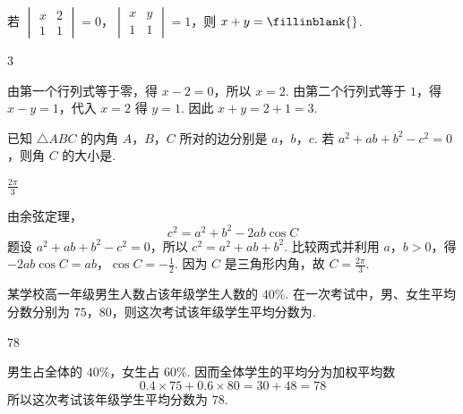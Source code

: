 \begin{problem}
若 \(\begin{vmatrix} x & 2 \\ 1 & 1 \end{vmatrix} = 0\)，\(\begin{vmatrix} x & y \\ 1 & 1 \end{vmatrix} = 1\)，则 \(x + y =\fillinblank{}\).

\begin{answer}
\(3\)
\end{answer}

\begin{solution}
由第一个行列式等于零，得 \(x-2=0\)，所以 \(x=2\). 由第二个行列式等于 \(1\)，得 \(x-y=1\)，代入 \(x=2\) 得 \(y=1\). 因此 \(x+y=2+1=3\).
\end{solution}
\end{problem}

\begin{problem}
已知 \(\triangle ABC\) 的内角 \(A\)，\(B\)，\(C\) 所对的边分别是 \(a\)，\(b\)，\(c\). 若 \(a^2 + ab + b^2 - c^2 = 0\)，则角 \(C\) 的大小是\fillinblank{}.

\begin{answer}
\(\frac{2\pi}{3}\)
\end{answer}

\begin{solution}
由余弦定理，
\[
c^2=a^2+b^2-2ab\cos C
\]
题设 \(a^2+ab+b^2-c^2=0\)，所以 \(c^2=a^2+ab+b^2\). 比较两式并利用 \(a\)，\(b>0\)，得
\(-2ab\cos C=ab\)，\(\cos C=-\frac{1}{2}\).
因为 \(C\) 是三角形内角，故 \(C=\frac{2\pi}{3}\).
\end{solution}
\end{problem}

\begin{problem}
某学校高一年级男生人数占该年级学生人数的 \(40\%\). 在一次考试中，男、女生平均分数分别为 \(75\)，\(80\)，则这次考试该年级学生平均分数为\fillinblank{}.

\begin{answer}
\(78\)
\end{answer}

\begin{solution}
男生占全体的 \(40\%\)，女生占 \(60\%\). 因而全体学生的平均分为加权平均数
\[
0.4\times75+0.6\times80=30+48=78
\]
所以这次考试该年级学生平均分数为 \(78\).
\end{solution}
\end{problem}

